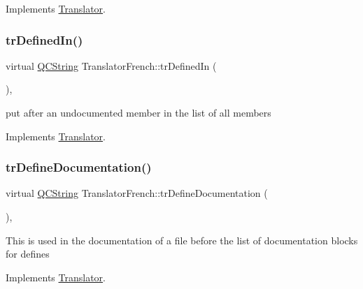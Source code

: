 Implements \mbox{\hyperlink{class_translator}{Translator}}.

\mbox{\label{class_translator_french_a7f2b0bc4d82770996b43bc12a988b263}} 
\subsubsection{\texorpdfstring{trDefinedIn()}{trDefinedIn()}}
{\footnotesize\ttfamily virtual \mbox{\hyperlink{class_q_c_string}{Q\+C\+String}} Translator\+French\+::tr\+Defined\+In (\begin{DoxyParamCaption}{ }\end{DoxyParamCaption})\hspace{0.3cm}{\ttfamily [inline]}, {\ttfamily [virtual]}}

put after an undocumented member in the list of all members 

Implements \mbox{\hyperlink{class_translator}{Translator}}.

\mbox{\label{class_translator_french_acc55b62f44a3b861c458ff6f9eb1751a}} 
\subsubsection{\texorpdfstring{trDefineDocumentation()}{trDefineDocumentation()}}
{\footnotesize\ttfamily virtual \mbox{\hyperlink{class_q_c_string}{Q\+C\+String}} Translator\+French\+::tr\+Define\+Documentation (\begin{DoxyParamCaption}{ }\end{DoxyParamCaption})\hspace{0.3cm}{\ttfamily [inline]}, {\ttfamily [virtual]}}

This is used in the documentation of a file before the list of documentation blocks for defines 

Implements \mbox{\hyperlink{class_translator}{Translator}}.

\mbox{\label{class_translator_french_a8e040467eea06f4bf7387e993ff030bf}} 

